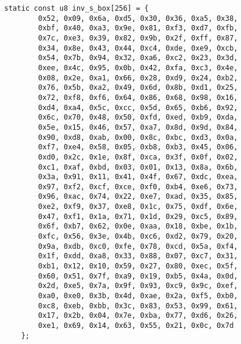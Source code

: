 \newpage
\begin{lstlisting}[style=C, caption={Invserse S-Box},captionpos=t]
	static const u8 inv_s_box[256] = {
		0x52, 0x09, 0x6a, 0xd5, 0x30, 0x36, 0xa5, 0x38,
		0xbf, 0x40, 0xa3, 0x9e, 0x81, 0xf3, 0xd7, 0xfb,
		0x7c, 0xe3, 0x39, 0x82, 0x9b, 0x2f, 0xff, 0x87,
		0x34, 0x8e, 0x43, 0x44, 0xc4, 0xde, 0xe9, 0xcb,
		0x54, 0x7b, 0x94, 0x32, 0xa6, 0xc2, 0x23, 0x3d,
		0xee, 0x4c, 0x95, 0x0b, 0x42, 0xfa, 0xc3, 0x4e,
		0x08, 0x2e, 0xa1, 0x66, 0x28, 0xd9, 0x24, 0xb2,
		0x76, 0x5b, 0xa2, 0x49, 0x6d, 0x8b, 0xd1, 0x25,
		0x72, 0xf8, 0xf6, 0x64, 0x86, 0x68, 0x98, 0x16,
		0xd4, 0xa4, 0x5c, 0xcc, 0x5d, 0x65, 0xb6, 0x92,
		0x6c, 0x70, 0x48, 0x50, 0xfd, 0xed, 0xb9, 0xda,
		0x5e, 0x15, 0x46, 0x57, 0xa7, 0x8d, 0x9d, 0x84,
		0x90, 0xd8, 0xab, 0x00, 0x8c, 0xbc, 0xd3, 0x0a,
		0xf7, 0xe4, 0x58, 0x05, 0xb8, 0xb3, 0x45, 0x06,
		0xd0, 0x2c, 0x1e, 0x8f, 0xca, 0x3f, 0x0f, 0x02,
		0xc1, 0xaf, 0xbd, 0x03, 0x01, 0x13, 0x8a, 0x6b,
		0x3a, 0x91, 0x11, 0x41, 0x4f, 0x67, 0xdc, 0xea,
		0x97, 0xf2, 0xcf, 0xce, 0xf0, 0xb4, 0xe6, 0x73,
		0x96, 0xac, 0x74, 0x22, 0xe7, 0xad, 0x35, 0x85,
		0xe2, 0xf9, 0x37, 0xe8, 0x1c, 0x75, 0xdf, 0x6e,
		0x47, 0xf1, 0x1a, 0x71, 0x1d, 0x29, 0xc5, 0x89,
		0x6f, 0xb7, 0x62, 0x0e, 0xaa, 0x18, 0xbe, 0x1b,
		0xfc, 0x56, 0x3e, 0x4b, 0xc6, 0xd2, 0x79, 0x20,
		0x9a, 0xdb, 0xc0, 0xfe, 0x78, 0xcd, 0x5a, 0xf4,
		0x1f, 0xdd, 0xa8, 0x33, 0x88, 0x07, 0xc7, 0x31,
		0xb1, 0x12, 0x10, 0x59, 0x27, 0x80, 0xec, 0x5f,
		0x60, 0x51, 0x7f, 0xa9, 0x19, 0xb5, 0x4a, 0x0d,
		0x2d, 0xe5, 0x7a, 0x9f, 0x93, 0xc9, 0x9c, 0xef,
		0xa0, 0xe0, 0x3b, 0x4d, 0xae, 0x2a, 0xf5, 0xb0,
		0xc8, 0xeb, 0xbb, 0x3c, 0x83, 0x53, 0x99, 0x61,
		0x17, 0x2b, 0x04, 0x7e, 0xba, 0x77, 0xd6, 0x26,
		0xe1, 0x69, 0x14, 0x63, 0x55, 0x21, 0x0c, 0x7d
	};
\end{lstlisting}


